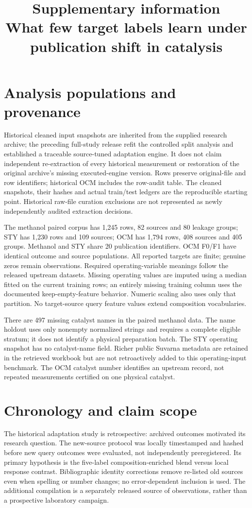 \documentclass[11pt]{article}
\title{Supplementary information\\What few target labels learn under publication shift in catalysis}
\author{}\date{}
\begin{document}
\maketitle
\section{Analysis populations and provenance}
Historical cleaned input snapshots are inherited from the supplied research archive; the preceding full-study release refit the controlled split analysis and established a traceable source-tuned adaptation engine. It does not claim independent re-extraction of every historical measurement or restoration of the original archive's missing executed-engine version. Rows preserve original-file and row identifiers; historical OCM includes the row-audit table. The cleaned snapshots, their hashes and actual train/test ledgers are the reproducible starting point. Historical raw-file curation exclusions are not represented as newly independently audited extraction decisions.

The methanol paired corpus has 1,245 rows, 82 sources and 80 leakage groups; STY has 1,230 rows and 109 sources; OCM has 1,794 rows, 408 sources and 405 groups. Methanol and STY share 20 publication identifiers. OCM F0/F1 have identical outcome and source populations. All reported targets are finite; genuine zeros remain observations. Required operating-variable meanings follow the released upstream datasets. Missing operating values are imputed using a median fitted on the current training rows; an entirely missing training column uses the documented keep-empty-feature behavior. Numeric scaling also uses only that partition. No target-source query feature values extend composition vocabularies.

There are 497 missing catalyst names in the paired methanol data. The name holdout uses only nonempty normalized strings and requires a complete eligible stratum; it does not identify a physical preparation batch. The STY operating snapshot has no catalyst-name field. Richer public Suvarna metadata are retained in the retrieved workbook but are not retroactively added to this operating-input benchmark. The OCM catalyst number identifies an upstream record, not repeated measurements certified on one physical catalyst.

\section{Chronology and claim scope}
The historical adaptation study is retrospective: archived outcomes motivated its research question. The new-source protocol was locally timestamped and hashed before new query outcomes were evaluated, not independently preregistered. Its primary hypothesis is the five-label composition-enriched blend versus local response contrast. Bibliographic identity corrections remove re-listed old sources even when spelling or number changes; no error-dependent inclusion is used. The additional compilation is a separately released source of observations, rather than a prospective laboratory campaign.
\end{document}
